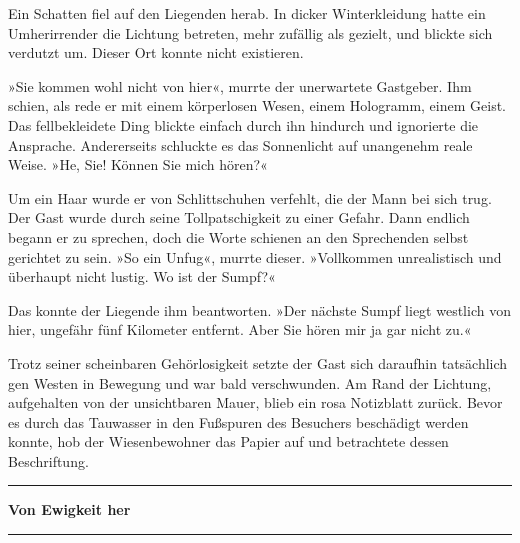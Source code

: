 Ein Schatten fiel auf den Liegenden herab. In dicker Winterkleidung hatte ein Umherirrender die Lichtung betreten, mehr zufällig als gezielt, und blickte sich verdutzt um. Dieser Ort konnte nicht existieren.

»Sie kommen wohl nicht von hier«, murrte der unerwartete Gastgeber. Ihm schien, als rede er mit einem körperlosen Wesen, einem Hologramm, einem Geist. Das fellbekleidete Ding blickte einfach durch ihn hindurch und ignorierte die Ansprache. Andererseits schluckte es das Sonnenlicht auf unangenehm reale Weise. »He, Sie! Können Sie mich hören?«

Um ein Haar wurde er von Schlittschuhen verfehlt, die der Mann bei sich trug. Der Gast wurde durch seine Tollpatschigkeit zu einer Gefahr. Dann endlich begann er zu sprechen, doch die Worte schienen an den Sprechenden selbst gerichtet zu sein. »So ein Unfug«, murrte dieser. »Vollkommen unrealistisch und überhaupt nicht lustig. Wo ist der Sumpf?«

Das konnte der Liegende ihm beantworten. »Der nächste Sumpf liegt westlich von hier, ungefähr fünf Kilometer entfernt. Aber Sie hören mir ja gar nicht zu.«

Trotz seiner scheinbaren Gehörlosigkeit setzte der Gast sich daraufhin tatsächlich gen Westen in Bewegung und war bald verschwunden. Am Rand der Lichtung, aufgehalten von der unsichtbaren Mauer, blieb ein rosa Notizblatt zurück. Bevor es durch das Tauwasser in den Fußspuren des Besuchers beschädigt werden konnte, hob der Wiesenbewohner das Papier auf und betrachtete dessen Beschriftung.

\noindent \parbox{\textwidth}{ \vspace{3ex} \hrule \vspace{3ex}

\textbf{Von Ewigkeit her}


\vspace{3ex} \hrule \vspace{3ex} }

